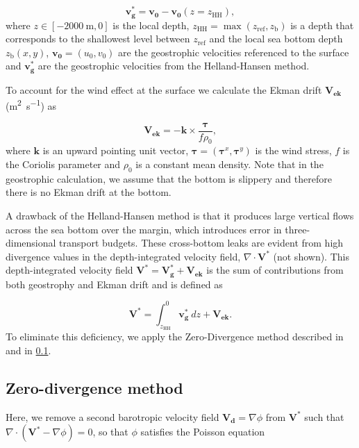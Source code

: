 \documentclass[preprint,3p,review,12pt]{elsarticle}
\renewcommand{\Vec}[1]{\mathbf{#1}}
\newcommand{\sub}[1]{_{\text{#1}}}
\begin{document}
\begin{equation}
\Vec{v\sub{g}^{*}} = \Vec{v\sub{0}} - \Vec{v\sub{0}}(z=z\sub{HH}),
\end{equation}
%
where $z \in [\SI{-2000}{\meter}, 0]$ is the local depth, $z\sub{HH} = \max(z\sub{ref},z\sub{b})$ is a depth that corresponds to the shallowest level between $z\sub{ref}$ and the local sea bottom depth $z\sub{b}(x,y)$, $\Vec{v\sub{0}}=(u\sub{0},v\sub{0})$ are the geostrophic velocities referenced to the surface and $\Vec{v\sub{g}^{*}}$ are the geostrophic velocities from the Helland-Hansen method.

To account for the wind effect at the surface we calculate the Ekman drift $\Vec{V\sub{ek}}$ (\si{\square\meter\per\second}) as

\begin{equation}
\Vec{V\sub{ek}} = -\Vec{k} \times \frac{\boldsymbol{\tau}}{f\rho\sub{0}},
\end{equation}
%
where $\Vec{k}$ is an upward pointing unit vector, $\boldsymbol{\tau}=(\boldsymbol{\tau}^{x},\boldsymbol{\tau}^{y})$ is the wind stress, $f$ is the Coriolis parameter and $\rho\sub{0}$ is a constant mean density. Note that in the geostrophic calculation, we assume that the bottom is slippery and therefore there is no Ekman drift at the bottom.

A drawback of the Helland-Hansen method is that it produces large vertical flows across the sea bottom over the margin, which introduces error in three-dimensional transport budgets. These cross-bottom leaks are evident from high divergence values in the depth-integrated velocity field, $\nabla\cdot\Vec{V}^{*}$ (not shown). This depth-integrated velocity field $\Vec{V}^{*}=\Vec{V\sub{g}^{*}}+\Vec{V\sub{ek}}$ is the sum of contributions from both geostrophy and Ekman drift and is defined as

\begin{equation}
\Vec{V}^{*} = \int_{z\sub{HH}}^{0}\Vec{v\sub{g}^{*}}\ dz + \Vec{V\sub{ek}}.
\end{equation}
%
To eliminate this deficiency, we apply the Zero-Divergence method described in \citet{Furue2017} and in \ref{Zero-divergence method}.

\subsection{Zero-divergence method} \label{Zero-divergence method}
Here, we remove a second barotropic velocity field $\Vec{V\sub{d}}=\nabla\phi$ from $\Vec{V}^{*}$ such that $\nabla\cdot(\Vec{V}^{*}-\nabla\phi)=0$, so that $\phi$ satisfies the Poisson equation
\end{document}
